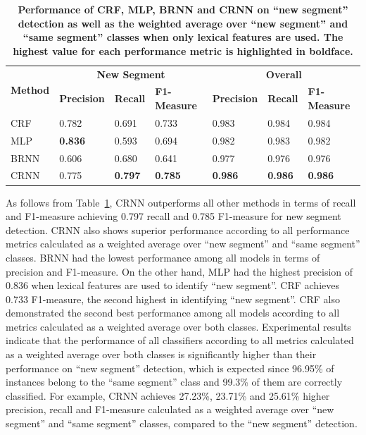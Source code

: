 \documentclass{amia}
\begin{document}
\begin{table}[ht]
\centering
\caption{\textbf{Performance of CRF, MLP, BRNN and CRNN on ``new segment'' detection as well as the weighted average over ``new segment'' and ``same segment'' classes when only lexical features are used. The highest value for each performance metric is highlighted in boldface.}}
\label{tab:result_base}
  \begin{tabular}{|l|l|l|l|l|l|l|}
  \hline
   \multirow{2}{*}{\textbf{Method}} & \multicolumn{3}{|c|}{\textbf{New Segment}} & \multicolumn{3}{|c|}{\textbf{Overall}} \\\cline{2-7}
   & \textbf{Precision}  & \textbf{Recall} & \textbf{F1-Measure} & \textbf{Precision}  & \textbf{Recall} & \textbf{F1-Measure} \\ \hline    
 CRF & 0.782 & 0.691 & 0.733 & 0.983 & 0.984 & 0.984 \\ \hline
 MLP & \textbf{0.836} & 0.593 & 0.694 & 0.982 & 0.983 & 0.982 \\ \hline
 BRNN & 0.606 & 0.680 & 0.641 & 0.977 & 0.976 & 0.976 \\ \hline
 CRNN & 0.775 & \textbf{0.797} & \textbf{0.785} & \textbf{0.986} & \textbf{0.986} & \textbf{0.986} \\ \hline
  \end{tabular}
\end{table}                              

As follows from Table~\ref{tab:result_base}, CRNN outperforms all other methods in terms of recall and F1-measure achieving 0.797 recall and 0.785 F1-measure for new segment detection. CRNN also shows superior performance according to all performance metrics calculated as a weighted average over ``new segment'' and ``same segment'' classes. BRNN had the lowest performance among all models in terms of precision and F1-measure. On the other hand, MLP had the highest precision of 0.836 when lexical features are used to identify ``new segment''. CRF achieves 0.733 F1-measure, the second highest in identifying ``new segment''. CRF also demonstrated the second best performance among all models according to all metrics calculated as a weighted average over both classes. Experimental results indicate that the performance of all classifiers according to all metrics calculated as a weighted average over both classes is significantly higher than their performance on ``new segment'' detection, which is expected since 96.95\% of instances belong to the ``same segment'' class and 99.3\% of them are correctly classified. For example, CRNN achieves 27.23\%, 23.71\% and 25.61\% higher precision, recall and F1-measure calculated as a weighted average over ``new segment'' and ``same segment'' classes, compared to the ``new segment'' detection.
\end{document}
